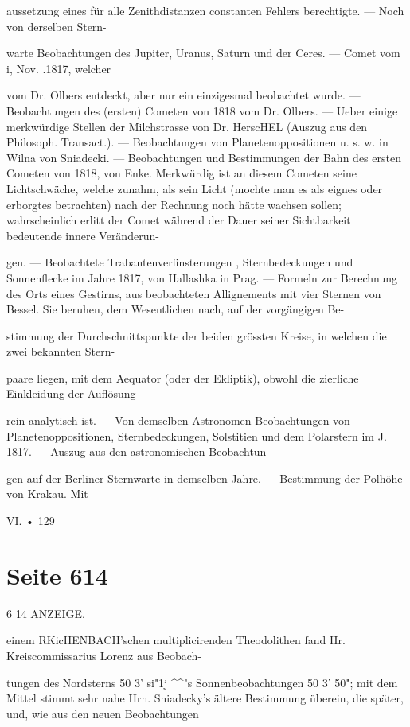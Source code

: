\documentclass[10pt,a4paper]{article}
\begin{document}
aussetzung eines für alle Zenithdistanzen constanten Fehlers berechtigte. — Noch von derselben Stern-

warte Beobachtungen des Jupiter, Uranus, Saturn und der Ceres. — Comet vom i, Nov. .1817, welcher

vom Dr. Olbers entdeckt, aber nur ein einzigesmal beobachtet wurde. — Beobachtungen des (ersten) Cometen von 1818 vom Dr. Olbers. — Ueber einige merkwürdige Stellen der Milchstrasse von Dr. HerscHEL (Auszug aus den Philosoph. Transact.). — Beobachtungen von Planetenoppositionen u. s. w. in Wilna von Sniadecki. — Beobachtungen und Bestimmungen der Bahn des ersten Cometen von 1818, von Enke. Merkwürdig ist an diesem Cometen seine Lichtschwäche, welche zunahm, als sein Licht (mochte man es als eignes oder erborgtes betrachten) nach der Rechnung noch hätte wachsen sollen; wahrscheinlich erlitt der Comet während der Dauer seiner Sichtbarkeit bedeutende innere Veränderun-

gen. — Beobachtete Trabantenverfinsterungen , Sternbedeckungen und Sonnenflecke im Jahre 1817, von Hallashka in Prag. — Formeln zur Berechnung des Orts eines Gestirns, aus beobachteten Allignements mit vier Sternen von Bessel. Sie beruhen, dem Wesentlichen nach, auf der vorgängigen Be-

stimmung der Durchschnittspunkte der beiden grössten Kreise, in welchen die zwei bekannten Stern-

paare liegen, mit dem Aequator (oder der Ekliptik), obwohl die zierliche Einkleidung der Auflösung

rein analytisch ist. — Von demselben Astronomen Beobachtungen von Planetenoppositionen, Sternbedeckungen, Solstitien und dem Polarstern im J. 1817. — Auszug aus den astronomischen Beobachtun-

gen auf der Berliner Sternwarte in demselben Jahre. — Bestimmung der Polhöhe von Krakau. Mit

VI. • 129


\newpage
\section*{Seite 614}
6 14 ANZEIGE.

einem RKicHENBACH'schen multiplicirenden Theodolithen fand Hr. Kreiscommissarius Lorenz aus Beobach-

tungen des Nordsterns 50\textdegree{} 3' si"1j \textasciicircum{}\textasciicircum{}"s Sonnenbeobachtungen 50\textdegree{} 3' 50"; mit dem Mittel stimmt sehr nahe Hrn. Sniadecky's ältere Bestimmung überein, die später, und, wie aus den neuen Beobachtungen
\end{document}
